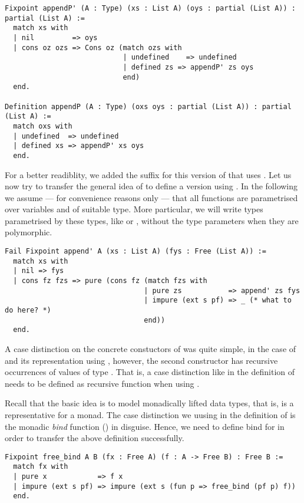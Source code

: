 \begin{verbatim}
Fixpoint appendP' (A : Type) (xs : List A) (oys : partial (List A)) : partial (List A) :=
  match xs with
  | nil         => oys
  | cons oz ozs => Cons oz (match ozs with
                            | undefined    => undefined
                            | defined zs => appendP' zs oys
                            end)
  end.

Definition appendP (A : Type) (oxs oys : partial (List A)) : partial (List A) :=
  match oxs with
  | undefined  => undefined
  | defined xs => appendP' xs oys
  end.
\end{verbatim}

For a better readiblity, we added the suffix  for this version
of  that uses .
Let us now try to transfer the general idea of  to
define a version using .
In the following we assume --- for convenience reasons only --- that
all functions are parametrised over variables  and
 of suitable type.
More particular, we will write types parametrised by these types, like
 or , without the type parameters when they are
polymorphic.

\begin{verbatim}
Fail Fixpoint append' A (xs : List A) (fys : Free (List A)) :=
  match xs with
  | nil => fys
  | cons fz fzs => pure (cons fz (match fzs with
                                 | pure zs           => append' zs fys
                                 | impure (ext s pf) => _ (* what to do here? *)
                                 end))
  end.
\end{verbatim}

A case distinction on the concrete constuctors of  was
quite simple, in the case of  and its representation using
, however, the second constructor  has
recursive occurrences of values of type .
That is, a case distinction like in the definition of 
needs to be defined as recursive function when using .

Recall that the basic idea is to model monadically lifted data types,
that is,  is a representative for a monad.
The case distinction we uusing in the definition of  is
the monadic \emph{bind} function (\cinl{(>>=)}) in disguise.
Hence, we need to define bind for  in order to transfer the
above definition successfully.

\begin{verbatim}
Fixpoint free_bind A B (fx : Free A) (f : A -> Free B) : Free B :=
  match fx with
  | pure x            => f x
  | impure (ext s pf) => impure (ext s (fun p => free_bind (pf p) f))
  end.
\end{verbatim}

